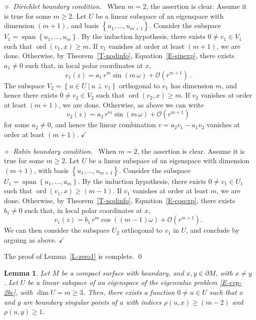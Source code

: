 \documentclass[12pt,a4paper]{amsart}
\theoremstyle{plain} %
\newtheorem{lemma}[theorem]{Lemma}
\theoremstyle{definition}
\numberwithin{equation}{section}
\numberwithin{figure}{section}
\numberwithin{table}{section}
\newcommand{\cO}{\mathcal{O}}
\DeclareMathOperator{\ord}{ord}
\DeclareMathOperator{\spanop}{span}
\newcommand{\qedc}{$\checkmark$}
\newcommand{\set}[1]{\left\lbrace #1 \right\rbrace}
\newcommand{\spanv}[1]{\spanop\!\left\lbrace #1 \right\rbrace}
\newcommand{\noid}{\noindent $\diamond$~}
\begin{document}
\emph{\noid Dirichlet boundary condition.}~ When $m=2$, the assertion is clear. Assume it is true for some $m\ge 2$. Let $U$ be a linear subspace of an eigenspace with dimension $(m+1)$, and basis $\set{u_1,\ldots,u_{m+1}}$. Consider the subspace $V_1 = \spanv{u_1,\ldots,u_m}$. By the induction hypothesis, there exists $0 \not = v_1 \in V_1$ such that $\ord(v_1,x) \ge m$. If $v_1$ vanishes at order at least $(m+1)$, we are done. Otherwise, by Theorem~\ref{T-nodinfo}, Equation~\eqref{E-sinexp}, there exists $a_1\not = 0$ such that, in local polar coordinates at $x$,
%
\begin{equation*}
v_1(z)=a_1\,r^m \sin(m \,\omega) +\cO(r^{m +1})\,.
\end{equation*}
%
The subspace $V_2=\set{u\in U ~|~ u \perp v_1}$ orthogonal to $v_1$ has dimension $m$, and hence there exists $0 \not = v_2 \in V_2$ such that $\ord(v_2,x) \ge m$. If $v_2$ vanishes at order at least $(m+1)$, we are done. Otherwise, as above we can write
%
\begin{equation*}
v_2(z)=a_2\,r^m \sin(m\, \omega) +\cO(r^{m +1})
\end{equation*}
%
for some $a_2 \not = 0$, and hence the linear combination $v = a_2 v_1 - a_1 v_2$ vanishes at order at least $(m+1)$. \hspace{1cm}\qedc \smallskip

\emph{\noid Robin boundary condition.}~ When $m=2$, the assertion is clear. Assume it is true for some $m\ge 2$. Let $U$ be a linear subspace of an eigenspace with dimension $(m+1)$, with basis $\set{u_1,\ldots,u_{m+1}}$. Consider the subspace $U_1 = \spanv{u_1,\ldots,u_m}$. By the induction hypothesis, there exists $0 \not = v_1 \in U_1$ such that $\ord(v_1,x) \ge (m-1)$. If $v_1$ vanishes at order at least $m$, we are done. Otherwise, by Theorem~\ref{T-nodinfo},  Equation~\eqref{E-cosexp}, there exists $b_1\not = 0$ such that, in local polar coordinates at $x$,
%
\begin{equation*}
v_1(z)=b_1\,r^m \cos((m-1) \omega) +\cO(r^{m+1}).
\end{equation*}
%
We can then consider the subspace $U_2$ orthogonal to $v_1$ in $U$, and conclude by arguing as above. \hspace{1cm}\qedc \smallskip

The proof of Lemma~\ref{L-zero1} is complete. \hfill \qed


\begin{lemma}\label{L-zero2} Let $M$ be a compact surface with
boundary, and $x, y \in \partial M$, with $x \not = y$. Let $U$ be a linear subspace of an eigenspace of the eigenvalue problem \eqref{E-evp-2bc}, with $\dim U = m \ge 3$. Then, there exists a function $0 \not = u\in U$ such that $x$ and $y$ are boundary singular points of $u$ with indices $\rho(u,x) \ge (m-2)$ and $\rho(u,y) \ge 1$.
\end{lemma}
\end{document}
